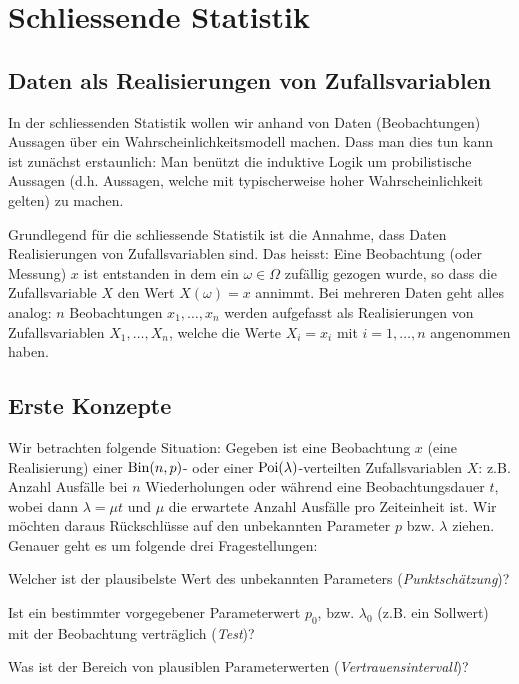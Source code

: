 \chapter{Schliessende Statistik}
\section{Daten als Realisierungen von Zufallsvariablen}
\label{sec8.1}
In der schliessenden Statistik wollen wir anhand von Daten (Beobachtungen) Aussagen über ein Wahrscheinlichkeitsmodell machen. Dass man dies tun kann ist zunächst erstaunlich: Man benützt die induktive Logik um probilistische Aussagen (d.h. Aussagen, welche mit typischerweise hoher Wahrscheinlichkeit gelten)  zu machen.

Grundlegend für die schliessende Statistik ist die Annahme, dass Daten Realisierungen von Zufallsvariablen sind. Das heisst: Eine Beobachtung (oder \glqq Messung\grqq) $x$ ist entstanden in dem ein $\omega\in\Omega$ zufällig gezogen wurde, so dass die Zufallsvariable $X$ den Wert $X(\omega)=x$ annimmt. Bei mehreren Daten geht alles analog: $n$ Beobachtungen $x_1,\ldots,x_n$ werden aufgefasst als Realisierungen von Zufallsvariablen $X_1,\ldots,X_n$, welche die Werte $X_i=x_i$ mit $i=1,\ldots,n$  angenommen haben.
\section{Erste Konzepte}
Wir betrachten folgende Situation: Gegeben ist eine Beobachtung $x$ (eine Realisierung) einer $\operatorname{Bin}(n,p)$- oder einer  $\operatorname{Poi}(\lambda)$-verteilten Zufallsvariablen $X$: z.B. Anzahl Ausfälle bei $n$ Wiederholungen oder während eine Beobachtungsdauer $t$, wobei dann $\lambda=\mu t$ und $\mu$ die erwartete Anzahl Ausfälle pro Zeiteinheit ist. Wir möchten daraus Rückschlüsse auf den unbekannten Parameter $p$ bzw. $\lambda$ ziehen. Genauer geht es um folgende drei Fragestellungen:
\begin{compactenum}[1.]
	\item Welcher ist der plausibelste Wert des unbekannten Parameters (\emph{Punktschätzung})?
	\item Ist ein bestimmter vorgegebener Parameterwert $p_0$, bzw. $\lambda_0$ (z.B. ein Sollwert) mit der Beobachtung verträglich (\emph{Test})?
	\item Was ist der Bereich von plausiblen Parameterwerten (\emph{Vertrauensintervall})?
\end{compactenum}
